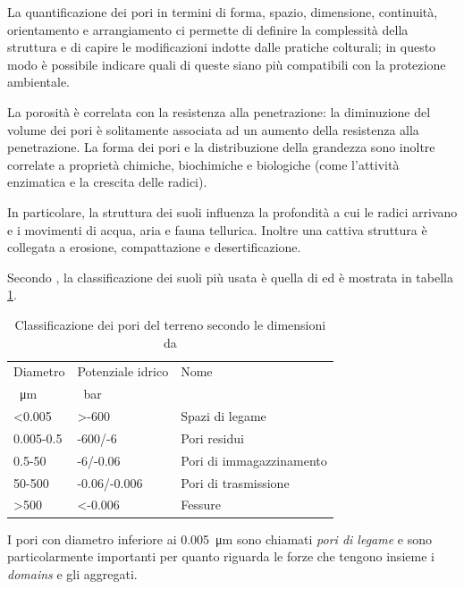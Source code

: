 \documentclass[11pt, a4paper, openright, titlepage, final, language = italian]{book}
\begin{document}
La quantificazione dei pori in termini di forma, spazio, dimensione,
continuit\`a, orientamento e arrangiamento ci permette di definire la
complessit\`a della struttura e di capire le modificazioni indotte dalle
pratiche colturali; in questo modo è possibile indicare quali di
queste siano più compatibili con la protezione ambientale.

La porosit\`a è correlata con la resistenza alla penetrazione: la
diminuzione del volume dei pori è solitamente associata ad un aumento
della resistenza alla penetrazione. La forma dei pori e la
distribuzione della grandezza sono inoltre correlate a propriet\`a
chimiche, biochimiche e biologiche (come l'attivit\`a enzimatica e la
crescita delle radici).

In particolare, la struttura dei suoli influenza la profondit\`a a cui
le radici arrivano e i movimenti di acqua, aria e fauna tellurica.
Inoltre una cattiva struttura è collegata a erosione, compattazione e
desertificazione.

Secondo \citet{pagliai2002soil}, la classificazione dei suoli più
usata è quella di \citet{greenland1977soil} ed \`e mostrata in tabella
\ref{tab:green}.

\begin{table}[ht]
  \caption{Classificazione dei pori del terreno secondo le dimensioni
    da \citet{pagliai2002soil}}
  \label{tab:green}
  \centering
  \begin{tabular}{lll}
    \toprule
    Diametro  & Potenziale idrico & Nome\\
    \SI{}{\micro\metre}  & \SI{}{\bar} & \\
    \midrule
    <0.005    & >-600        & Spazi di legame\\
    0.005-0.5 & -600/-6      & Pori residui\\
    0.5-50    & -6/-0.06     & Pori di immagazzinamento\\
    50-500    & -0.06/-0.006 & Pori di trasmissione\\
    >500      & <-0.006      & Fessure\\
    \bottomrule
  \end{tabular}
\end{table}

I pori con diametro inferiore ai \SI{0.005}{\micro\meter} sono
chiamati \textit{pori di legame} e sono particolarmente importanti per
quanto riguarda le forze che tengono insieme i \emph{domains} e gli
aggregati.  
\end{document}
